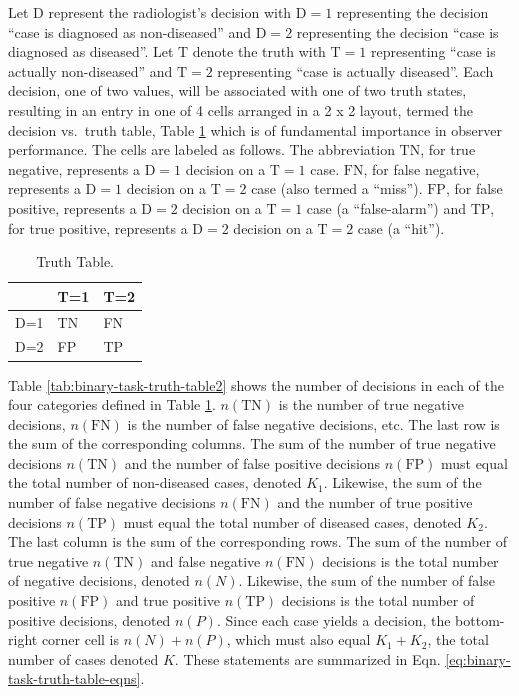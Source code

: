 \documentclass[
]{book}
\begin{document}
Let \(\text{D}\) represent the radiologist's decision with \(\text{D}=1\) representing the decision ``case is diagnosed as non-diseased'' and \(\text{D}=2\) representing the decision ``case is diagnosed as diseased''. Let \(\text{T}\) denote the truth with \(\text{T}=1\) representing ``case is actually non-diseased'' and \(\text{T}=2\) representing ``case is actually diseased''. Each decision, one of two values, will be associated with one of two truth states, resulting in an entry in one of 4 cells arranged in a 2 x 2 layout, termed the decision vs.~truth table, Table \ref{tab:binary-task-truth-table} which is of fundamental importance in observer performance. The cells are labeled as follows. The abbreviation \(\text{TN}\), for true negative, represents a \(\text{D}=1\) decision on a \(\text{T}=1\) case. \(\text{FN}\), for false negative, represents a \(\text{D}=1\) decision on a \(\text{T}=2\) case (also termed a ``miss''). \(\text{FP}\), for false positive, represents a \(\text{D}=2\) decision on a \(\text{T}=1\) case (a ``false-alarm'') and \(\text{TP}\), for true positive, represents a \(\text{D}=2\) decision on a \(\text{T}=2\) case (a ``hit'').

\begin{table}

\caption{\label{tab:binary-task-truth-table}Truth Table.}
\centering
\begin{tabular}[t]{l|l|l}
\hline
  & T=1 & T=2\\
\hline
D=1 & TN & FN\\
\hline
D=2 & FP & TP\\
\hline
\end{tabular}
\end{table}

Table \ref{tab:binary-task-truth-table2} shows the number of decisions in each of the four categories defined in Table \ref{tab:binary-task-truth-table}. \(n(\text{TN})\) is the number of true negative decisions, \(n(\text{FN})\) is the number of false negative decisions, etc. The last row is the sum of the corresponding columns. The sum of the number of true negative decisions \(n(\text{TN})\) and the number of false positive decisions \(n(\text{FP})\) must equal the total number of non-diseased cases, denoted \(K_1\). Likewise, the sum of the number of false negative decisions \(n(\text{FN})\) and the number of true positive decisions \(n(\text{TP})\) must equal the total number of diseased cases, denoted \(K_2\). The last column is the sum of the corresponding rows. The sum of the number of true negative \(n(\text{TN})\) and false negative \(n(\text{FN})\) decisions is the total number of negative decisions, denoted \(n(N)\). Likewise, the sum of the number of false positive \(n(\text{FP})\) and true positive \(n(\text{TP})\) decisions is the total number of positive decisions, denoted \(n(P)\). Since each case yields a decision, the bottom-right corner cell is \(n(N) + n(P)\), which must also equal \(K_1+K_2\), the total number of cases denoted \(K\). These statements are summarized in Eqn. \eqref{eq:binary-task-truth-table-eqns}.
\end{document}
